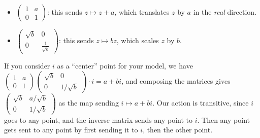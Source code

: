 \begin{itemize}
    \item $
        \begin{pmatrix}
            1 & a \\ 0 & 1
        \end{pmatrix}$: this sends $z \mapsto  z+a$, which translates $z$ by $a$ in the \emph{real} direction.
    \item $
        \begin{pmatrix}
            \sqrt{b} & 0 \\ 0 & \frac{1}{\sqrt{b}  } 
        \end{pmatrix}$: this sends $z \mapsto bz$, which scales $z$ by $b$.
\end{itemize}
If you consider $i$ as a ``center'' point for your model, we have $
\left( 
\begin{smallmatrix}
    1 & a \\ 0 & 1
\end{smallmatrix}\right) \left( 
\begin{smallmatrix}
    \sqrt{b} & 0 \\ 0 & 1 /\sqrt{b} 
\end{smallmatrix}\right) \cdot i=a+bi$, and composing the matrices gives $\left( 
\begin{smallmatrix}
    \sqrt{b} & a / \sqrt{b} \\ 0 & 1 / \sqrt{b} 
\end{smallmatrix}\right) $ as the map sending $i \mapsto a+bi$. Our action is transitive, since $i$ goes to any point, and the inverse matrix sends any point to $i$. Then any point gets sent to any point by first sending it to $i$, then the other point.

